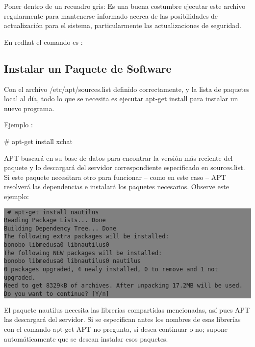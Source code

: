 \documentclass[12pt]{article}
\begin{document}
Poner dentro de un recuadro gris:
Es una buena costumbre ejecutar este archivo regularmente para mantenerse informado acerca de las posibilidades de actualización para el sistema, particularmente las actualizaciones de seguridad.

En redhat el comando es :

\subsection*{Instalar un Paquete de Software}

Con el archivo /etc/apt/sources.list definido correctamente, y la lista de paquetes local al día, todo lo
que se necesita es ejecutar apt-get install para instalar un nuevo programa.

Ejemplo :

     \# apt-get install xchat

APT buscará en su base de datos para encontrar la versión más reciente del paquete y lo descargará del servidor correspondiente especificado en sources.list. 
Si este paquete necesitara otro para funcionar -- como en este caso -- APT resolverá las dependencias e instalará los paquetes necesarios. Observe este ejemplo:


\colorbox{grey}{\parbox[t]{0.95\linewidth}{ \vspace*{0.5cm} {\tt
     \# apt-get install nautilus \\ 
     Reading Package Lists... Done \\
     Building Dependency Tree... Done\\
     The following extra packages will be installed:\\
       bonobo libmedusa0 libnautilus0\\
     The following NEW packages will be installed:\\
       bonobo libmedusa0 libnautilus0 nautilus\\
     0 packages upgraded, 4 newly installed, 0 to remove and 1 not upgraded.\\
     Need to get 8329kB of archives. After unpacking 17.2MB will be used.\\
     Do you want to continue? [Y/n]\\
 } \vspace*{0.5cm} } } 

El paquete nautilus necesita las librerías compartidas mencionadas, así pues APT las descargará del servidor. Si se especifican antes los nombres de esas librerías con el comando apt-get APT no pregunta, si desea continuar o no; supone automáticamente que se desean instalar esos paquetes.
\end{document}
